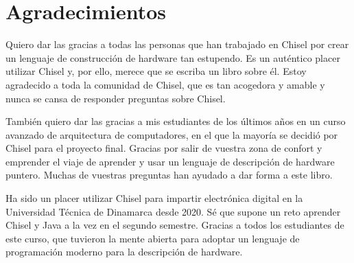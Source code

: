 \documentclass[%
    10pt,
    headinclude, footinclude=false,
    openright, %
    notitlepage,
    cleardoublepage=empty,
    headsepline,
    numbers=noenddot,
    bibliography=totoc, index=totoc,
    ]{scrbook}
\begin{document}
\section*{Agradecimientos}


Quiero dar las gracias a todas las personas que han trabajado en Chisel por crear un lenguaje de construcción de hardware tan 
estupendo. Es un auténtico placer utilizar Chisel y, por ello, merece que se escriba un libro sobre él. Estoy agradecido a toda la 
comunidad de Chisel, que es tan acogedora y amable y nunca se cansa de responder preguntas sobre Chisel.


También quiero dar las gracias a mis estudiantes de los últimos años en un curso avanzado de arquitectura de computadores, 
en el que la mayoría se decidió por Chisel para el proyecto final. Gracias por salir de vuestra zona de confort y emprender el 
viaje de aprender y usar un lenguaje de descripción de hardware puntero. Muchas de vuestras preguntas han ayudado a dar forma a 
este libro.


Ha sido un placer utilizar Chisel para impartir electrónica digital en la Universidad Técnica de Dinamarca desde 2020. 
Sé que supone un reto aprender Chisel y Java a la vez en el segundo semestre. Gracias a todos los estudiantes de este curso, 
que tuvieron la mente abierta para adoptar un lenguaje de programación moderno para la descripción de hardware.
\end{document}
